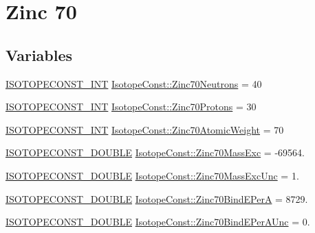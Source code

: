 \hypertarget{group___isotope_const-_zinc-_zn70}{}\section{Zinc 70}
\label{group___isotope_const-_zinc-_zn70}
\subsection*{Variables}
\begin{DoxyCompactItemize}
\item 
\mbox{\hyperlink{group___isotope_const-_macros_ga5f18360b3e99483a35c32d789e62621c}{I\+S\+O\+T\+O\+P\+E\+C\+O\+N\+S\+T\+\_\+\+I\+NT}} \mbox{\hyperlink{group___isotope_const-_zinc-_zn70_ga79c81b9f2a0302139e77e76c9b5a85a7}{Isotope\+Const\+::\+Zinc70\+Neutrons}} = 40
\item 
\mbox{\hyperlink{group___isotope_const-_macros_ga5f18360b3e99483a35c32d789e62621c}{I\+S\+O\+T\+O\+P\+E\+C\+O\+N\+S\+T\+\_\+\+I\+NT}} \mbox{\hyperlink{group___isotope_const-_zinc-_zn70_ga9137ec56da014ace4c752373c47e6c71}{Isotope\+Const\+::\+Zinc70\+Protons}} = 30
\item 
\mbox{\hyperlink{group___isotope_const-_macros_ga5f18360b3e99483a35c32d789e62621c}{I\+S\+O\+T\+O\+P\+E\+C\+O\+N\+S\+T\+\_\+\+I\+NT}} \mbox{\hyperlink{group___isotope_const-_zinc-_zn70_gaebfb1fbb864b2472699673e14c8484aa}{Isotope\+Const\+::\+Zinc70\+Atomic\+Weight}} = 70
\item 
\mbox{\hyperlink{group___isotope_const-_macros_ga8f45a7272ce02c0b4c65c44636ed719a}{I\+S\+O\+T\+O\+P\+E\+C\+O\+N\+S\+T\+\_\+\+D\+O\+U\+B\+LE}} \mbox{\hyperlink{group___isotope_const-_zinc-_zn70_ga7af42d564f7b8179114b3ca371467f81}{Isotope\+Const\+::\+Zinc70\+Mass\+Exc}} = -\/69564.
\item 
\mbox{\hyperlink{group___isotope_const-_macros_ga8f45a7272ce02c0b4c65c44636ed719a}{I\+S\+O\+T\+O\+P\+E\+C\+O\+N\+S\+T\+\_\+\+D\+O\+U\+B\+LE}} \mbox{\hyperlink{group___isotope_const-_zinc-_zn70_ga435a55b968921c1d833e82fde6683469}{Isotope\+Const\+::\+Zinc70\+Mass\+Exc\+Unc}} = 1.
\item 
\mbox{\hyperlink{group___isotope_const-_macros_ga8f45a7272ce02c0b4c65c44636ed719a}{I\+S\+O\+T\+O\+P\+E\+C\+O\+N\+S\+T\+\_\+\+D\+O\+U\+B\+LE}} \mbox{\hyperlink{group___isotope_const-_zinc-_zn70_ga5bc276536575eb1baa547438076ab6cc}{Isotope\+Const\+::\+Zinc70\+Bind\+E\+PerA}} = 8729.
\item 
\mbox{\hyperlink{group___isotope_const-_macros_ga8f45a7272ce02c0b4c65c44636ed719a}{I\+S\+O\+T\+O\+P\+E\+C\+O\+N\+S\+T\+\_\+\+D\+O\+U\+B\+LE}} \mbox{\hyperlink{group___isotope_const-_zinc-_zn70_ga49336320ebf940e23404dfb0da61e84f}{Isotope\+Const\+::\+Zinc70\+Bind\+E\+Per\+A\+Unc}} = 0.

\end{DoxyCompactItemize}
